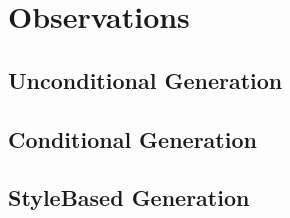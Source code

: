 \chapter{Observations} \label{chap-4}







\section{Unconditional Generation}

\section{Conditional Generation}

\section{Style\-Based Generation}
